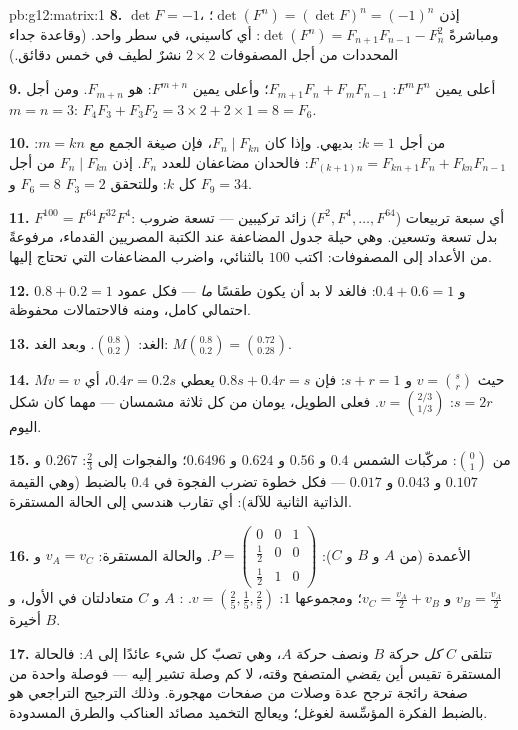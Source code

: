 \begin{solution}{pb:g12:matrix:1}
\textbf{8.} $\det F = -1$، إذن
$\det(F^n) = (\det F)^n = (-1)^n$؛ ومباشرةً
$\det(F^n) = F_{n+1}F_{n-1} - F_n^2$: أي كاسيني، في سطر واحد. (وقاعدة
جداء المحددات من أجل المصفوفات $2 \times 2$ نشرٌ لطيف
في خمس دقائق.)

\textbf{9.} أعلى يمين $F^m F^n$:
$F_{m+1}F_n + F_m F_{n-1}$؛ وأعلى يمين $F^{m+n}$:
هو $F_{m+n}$. ومن أجل $m = n = 3$:
$F_4 F_3 + F_3 F_2 = 3 \times 2 + 2 \times 1 = 8 = F_6$.

\textbf{10.} من أجل $k = 1$: بديهي. وإذا كان $F_n \mid F_{kn}$، فإن
صيغة الجمع مع $m = kn$:
$F_{(k+1)n} = F_{kn+1}F_n + F_{kn}F_{n-1}$: فالحدان مضاعفان
للعدد $F_n$. إذن $F_n \mid F_{kn}$ من أجل كل $k$: وللتحقق
$F_3 = 2$  $F_6 = 8$ و $F_9 = 34$.

\textbf{11.} $F^{100} = F^{64} F^{32} F^4$: أي سبعة تربيعات
($F^2, F^4, \dots, F^{64}$) زائد تركيبين --- تسعة
ضروب بدل تسعة وتسعين. وهي
حيلة جدول المضاعفة عند الكتبة المصريين القدماء، مرفوعةً من
الأعداد إلى المصفوفات: اكتب $100$ بالثنائي، واضرب
المضاعفات التي تحتاج إليها.

\textbf{12.} $0.8 + 0.2 = 1$ و $0.4 + 0.6 = 1$: فالغد
لا بد أن يكون طقسًا \emph{ما} --- فكل عمود 
احتمالي كامل، ومنه فالاحتمالات محفوظة.

\textbf{13.} الغد: $\binom{0.8}{0.2}$. وبعد الغد:
$M\binom{0.8}{0.2} = \binom{0.72}{0.28}$.

\textbf{14.} $Mv = v$ حيث $v = \binom{s}{r}$ و $s + r = 1$:
فإن $0.8s + 0.4r = s$ يعطي $0.4r = 0.2s$، أي $s = 2r$:
$v = \binom{2/3}{1/3}$. فعلى  الطويل، يومان من كل ثلاثة
مشمسان --- مهما كان شكل اليوم.

\textbf{15.} من $\binom01$: مركّبات الشمس $0.4$ و $0.56$
و $0.624$ و $0.6496$؛ والفجوات إلى $\frac23$: $0.267$ و $0.107$
و $0.043$ و $0.017$ --- فكل خطوة تضرب الفجوة في
$0.4$ بالضبط (وهي القيمة الذاتية الثانية للآلة): أي تقارب
هندسي إلى الحالة المستقرة.

\textbf{16.} الأعمدة (من $A$ و $B$ و $C$):
$P = \begin{pmatrix} 0 & 0 & 1\\ \frac12 & 0 & 0\\
\frac12 & 1 & 0\end{pmatrix}$. والحالة المستقرة: $v_A = v_C$ و
$v_B = \frac{v_A}{2}$ و $v_C = \frac{v_A}{2} + v_B$؛ ومجموعها
$1$: $v = \left(\frac25, \frac15, \frac25\right)$. :
$A$ و $C$ متعادلتان في الأول، و $B$ أخيرة.

\textbf{17.} تتلقى $C$ \emph{كل} حركة $B$ ونصف
حركة $A$، وهي تصبّ كل شيء عائدًا إلى $A$: فالحالة
المستقرة تقيس أين \emph{يقضي} المتصفح وقته، لا كم
وصلة تشير إليه --- فوصلة واحدة من صفحة رائجة ترجح
عدة وصلات من صفحات مهجورة. وذلك الترجيح التراجعي هو
بالضبط الفكرة المؤسِّسة لغوغل؛ ويعالج التخميد مصائد العناكب
والطرق المسدودة.


\end{solution}
